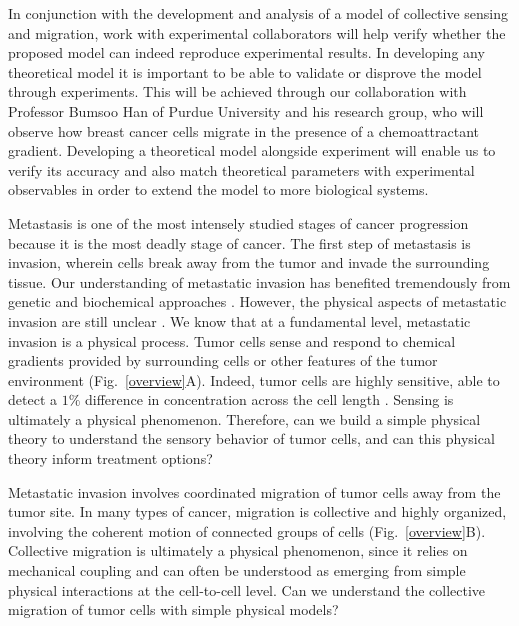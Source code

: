 In conjunction with the development and analysis of a model of collective sensing and migration, work with experimental collaborators will help verify whether the proposed model can indeed reproduce experimental results. In developing any theoretical model it is important to be able to validate or disprove the model through experiments. This will be achieved through our collaboration with Professor Bumsoo Han of Purdue University and his research group, who will observe how breast cancer cells migrate in the presence of a chemoattractant gradient. Developing a theoretical model alongside experiment will enable us to verify its accuracy and also match theoretical parameters with experimental observables in order to extend the model to more biological systems.


Metastasis is one of the most intensely studied stages of cancer progression because it is the most deadly stage of cancer. The first step of metastasis is invasion, wherein cells break away from the tumor and invade the surrounding tissue. Our understanding of metastatic invasion has benefited tremendously from genetic and biochemical approaches \cite{leber2009molecular, hanahan2000hallmarks, hanahan2011hallmarks}. However, the physical aspects of metastatic invasion are still unclear \cite{hanahan2011hallmarks}. We know that at a fundamental level, metastatic invasion is a physical process. Tumor cells sense and respond to chemical gradients provided by surrounding cells
\cite{bhowmick2004stromal, condeelis2006macrophages, shields2007autologous, puliafito2015three} or other features of the tumor environment
\cite{shields2007autologous, polacheck2011interstitial, shieh2011regulation} (Fig.\ \ref{overview}A). Indeed, tumor cells are highly sensitive, able to detect a $1\%$ difference in concentration across the cell length
\cite{shields2007autologous}. Sensing is ultimately a physical phenomenon. Therefore, can we build a simple physical theory to understand the sensory behavior of tumor cells, and can this physical theory inform treatment options?

Metastatic invasion involves coordinated migration of tumor cells away from the tumor site. In many types of cancer, migration is collective and highly organized, involving the coherent motion of connected groups of cells
\cite{cheung2013collective, friedl2012classifying, aceto2014circulating, puliafito2015three}
(Fig.\ \ref{overview}B).
Collective migration is ultimately a physical phenomenon, since it relies on mechanical coupling and can often be understood as emerging from simple physical interactions at the cell-to-cell level. Can we understand the collective migration of tumor cells with simple physical models?

